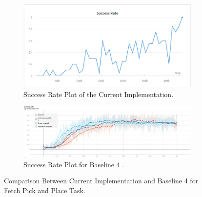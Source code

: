 \begin{figure}[h!]
     \centering
     \begin{subfigure}[b]{0.5\textwidth}
         \centering
         \includegraphics[width=\textwidth]{images/FPAPASR.png}
         \caption{Success Rate Plot of the Current Implementation.}
     \end{subfigure}
     \begin{subfigure}[b]{0.5\textwidth}
         \centering
         \includegraphics[width=\textwidth]{images/FPAPRRE.png}
         \caption{Success Rate Plot for Baseline 4 \cite{nagpal2020reward}.}
     \end{subfigure}
        \caption{Comparison Between Current Implementation and Baseline 4 for Fetch Pick and Place Task.}
        \label{fig:FPAPR2}
\end{figure}

